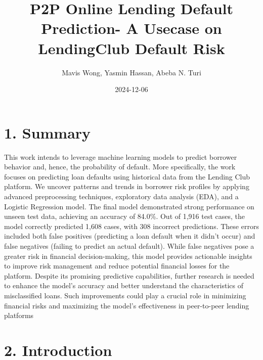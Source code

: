 \documentclass[
  letterpaper,
  DIV=11,
  numbers=noendperiod]{scrartcl}
\title{P2P Online Lending Default Prediction- A Usecase on LendingClub
Default Risk}
\author{Mavis Wong, Yasmin Hassan, Abeba N. Turi}
\date{2024-12-06}
\renewcommand*\contentsname{Table of contents}
\newcommand\contentsname{Table of contents}
\begin{document}
\maketitle

\renewcommand*\contentsname{Table of contents}
{
\hypersetup{linkcolor=}
\setcounter{tocdepth}{6}
\tableofcontents
}

\newpage

\section{\texorpdfstring{1. Summary}{1. Summary }}\label{summary}

This work intends to leverage machine learning models to predict
borrower behavior and, hence, the probability of default. More
specifically, the work focuses on predicting loan defaults using
historical data from the Lending Club platform. We uncover patterns and
trends in borrower risk profiles by applying advanced preprocessing
techniques, exploratory data analysis (EDA), and a Logistic Regression
model. The final model demonstrated strong performance on unseen test
data, achieving an accuracy of 84.0\%. Out of 1,916 test cases, the
model correctly predicted 1,608 cases, with 308 incorrect predictions.
These errors included both false positives (predicting a loan default
when it didn't occur) and false negatives (failing to predict an actual
default). While false negatives pose a greater risk in financial
decision-making, this model provides actionable insights to improve risk
management and reduce potential financial losses for the platform.
Despite its promising predictive capabilities, further research is
needed to enhance the model's accuracy and better understand the
characteristics of misclassified loans. Such improvements could play a
crucial role in minimizing financial risks and maximizing the model's
effectiveness in peer-to-peer lending platforms

\section{\texorpdfstring{2. Introduction
}{2. Introduction  }}\label{introduction}
\end{document}
